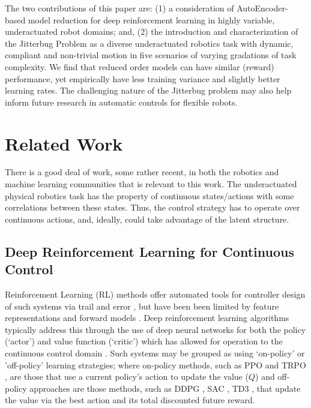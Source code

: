 \documentclass[letterpaper, 10 pt, conference]{ieeeconf}
\begin{document}
The two contributions of this paper are: (1) a consideration of AutoEncoder-based model reduction for deep reinforcement learning in highly variable, underactuated robot domains; and, (2) the introduction and characterization of the Jitterbug Problem as a diverse underactuated robotics task with dynamic, compliant and non-trivial motion in five scenarios of varying gradations of task complexity.
We find that reduced order models can have similar (reward) performance, yet empirically have less training variance and slightly better learning rates.  
The challenging nature of the Jitterbug problem may also help inform future research in automatic controls for flexible robots.

\section{Related Work}

There is a good deal of work, some rather recent, in both the robotics and machine learning communities that is relevant to this work.  The underactuated physical robotics task has the property of continuous states/actions with some correlations between these states.   Thus, the control strategy has to operate over continuous actions, and, ideally, could take advantage of the latent structure. 

\subsection{Deep Reinforcement Learning for Continuous Control}

Reinforcement Learning (RL) methods offer automated tools for controller design of such systems via trail and error \cite{sutton1998reinforcement}, but have been been limited by feature representations and forward models \cite{duan2016benchmarking}. 
Deep reinforcement learning algorithms typically address this through the use of deep neural networks for both the policy (`actor') and value function (`critic') which has allowed for operation to the continuous control domain \cite{mnih2015human, DDPG}. 
Such systems may be grouped as using `on-policy' or 'off-policy' learning strategies; where on-policy methods, such as PPO \cite{PPO} and TRPO \cite{TRPO}, are those that use a current policy's action to update the value ($Q$) and off-policy approaches are those methods, such as DDPG \cite{DDPG}, SAC \cite{SAC}, TD3 \cite{TD3}, that update the value via the best action and its total discounted future reward.  
\end{document}
